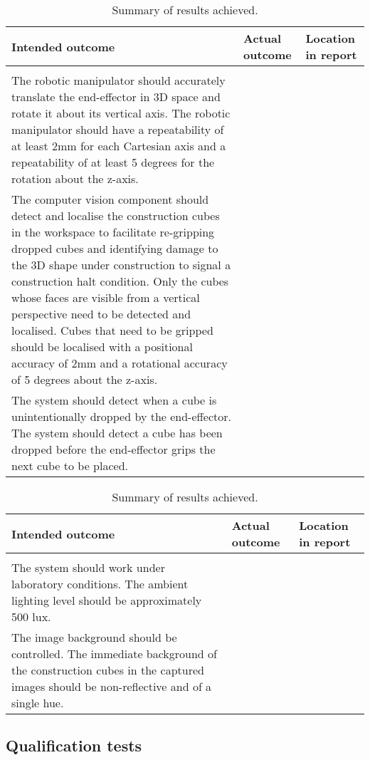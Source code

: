 \begin{table}[h]
	\renewcommand{\arraystretch}{1.3}
	\centering
	\begin{tabular}{|>{\raggedright}m{6.5cm}|>{\raggedright}m{5cm}|>{\raggedright\arraybackslash}m{3cm}|}
		\hline
		\textbf{Intended outcome} & \textbf{Actual outcome} & \textbf{Location in report} \\
		\hline
		\multicolumn{3}{|l|}{\textbf{Core mission requirements and specifications}} \\
		\hline
		The robotic manipulator should accurately translate the end-effector in 3D space and rotate it about its vertical axis. The robotic manipulator should have a repeatability of at least 2mm for each Cartesian axis and a repeatability of at least 5 degrees for the rotation about the z-axis. & & \\
		\hline
		The computer vision component should detect and localise the construction cubes in the workspace to facilitate re-gripping dropped cubes and identifying damage to the 3D shape under construction to signal a construction halt condition. Only the cubes whose faces are visible from a vertical perspective need to be detected and localised. Cubes that need to be gripped should be localised with a positional accuracy of 2mm and a rotational accuracy of 5 degrees about the z-axis. & & \\
		\hline
		The system should detect when a cube is unintentionally dropped by the end-effector. The system should detect a cube has been dropped before the end-effector grips the next cube to be placed. & & \\
		\hline
	\end{tabular}
	\caption{\label{tab:results_summary_p2}Summary of results achieved.}
\end{table}

\begin{table}[h]
	\renewcommand{\arraystretch}{1.3}
	\centering
	\begin{tabular}{|>{\raggedright}m{6.5cm}|>{\raggedright}m{5cm}|>{\raggedright\arraybackslash}m{3cm}|}
		\hline
		\textbf{Intended outcome} & \textbf{Actual outcome} & \textbf{Location in report} \\
		\hline
		\multicolumn{3}{|l|}{\textbf{Field condition requirements and specifications}} \\
		\hline
		The system should work under laboratory conditions. The ambient lighting level should be approximately 500 lux. & & \\
		\hline
		The image background should be controlled. The immediate background of the construction cubes in the captured images should be non-reflective and of a single hue.& & \\
		\hline
	\end{tabular}
	\caption{\label{tab:results_summary_p3}Summary of results achieved.}
\end{table}

\subsection{Qualification tests}




\newpage



